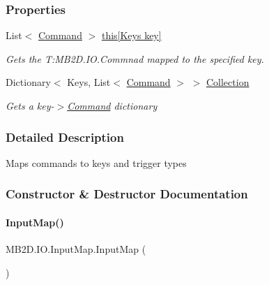 \subsubsection*{Properties}
\begin{DoxyCompactItemize}
\item 
List$<$ \hyperlink{class_m_b2_d_1_1_i_o_1_1_command}{Command} $>$ \hyperlink{class_m_b2_d_1_1_i_o_1_1_input_map_ad78e010b598d32be8fbd1b30c41b7ee0}{this\mbox{[}\+Keys key\mbox{]}}
\begin{DoxyCompactList}\small\item\em Gets the T\+:\+M\+B2\+D.\+I\+O.\+Commnad mapped to the specified key. \end{DoxyCompactList}\item 
Dictionary$<$ Keys, List$<$ \hyperlink{class_m_b2_d_1_1_i_o_1_1_command}{Command} $>$ $>$ \hyperlink{class_m_b2_d_1_1_i_o_1_1_input_map_a16a798fd9e5c599591620b52c5eb8a55}{Collection}
\begin{DoxyCompactList}\small\item\em Gets a key-\/$>$\hyperlink{class_m_b2_d_1_1_i_o_1_1_command}{Command} dictionary \end{DoxyCompactList}\end{DoxyCompactItemize}


\subsubsection{Detailed Description}
Maps commands to keys and trigger types 



\subsubsection{Constructor \& Destructor Documentation}
\hypertarget{class_m_b2_d_1_1_i_o_1_1_input_map_a37cd0d946d9a15c9a5ce96d5ca2ca8f1}{}\label{class_m_b2_d_1_1_i_o_1_1_input_map_a37cd0d946d9a15c9a5ce96d5ca2ca8f1} 
\paragraph{\texorpdfstring{Input\+Map()}{InputMap()}}
{\footnotesize\ttfamily M\+B2\+D.\+I\+O.\+Input\+Map.\+Input\+Map (\begin{DoxyParamCaption}{ }\end{DoxyParamCaption})\hspace{0.3cm}{\ttfamily [inline]}}



